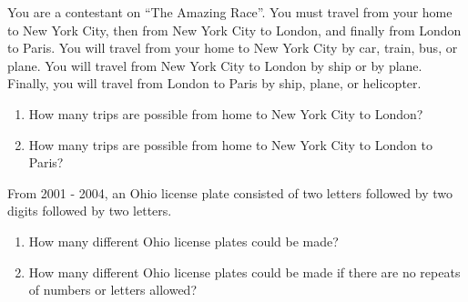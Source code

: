 \documentclass{ximera}
\begin{document}
\begin{problem}
You are a contestant on ``The Amazing Race''.  You must travel from your home to New York City, then from New York City to London, and finally from London to Paris.  You will travel from your home to New York City by car, train, bus, or plane.  You will travel from New York City to London by ship or by plane.  Finally, you will travel from London to Paris by ship, plane, or helicopter.
\begin{enumerate}
\item How many trips are possible from home to New York City to London?
\item How many trips are possible from home to New York City to London to Paris?
\end{enumerate}
\end{problem}

\begin{problem}
From 2001 - 2004, an Ohio license plate consisted of two letters followed by two digits followed by two letters.
\begin{enumerate}
\item How many different Ohio license plates could be made?
\item How many different Ohio license plates could be made if there are no repeats of numbers or letters allowed?
\end{enumerate}
\end{problem}
\end{document}

